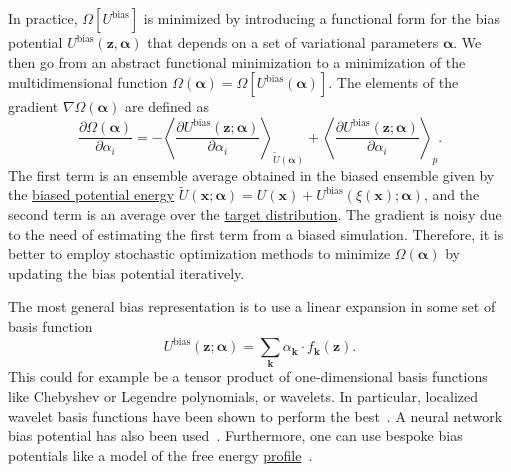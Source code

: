 \documentclass[9pt,review]{livecoms}
\newcommand{\vx}{\mathbf{x}}
\newcommand{\vz}{\mathbf{z}}
\begin{document}
In practice, $\Omega [U^{\mathrm{bias}}]$ is minimized by introducing a functional form for the bias potential $U^\mathrm{bias}(\vz,\boldsymbol{\alpha})$ that depends on a set of variational parameters $\boldsymbol{\alpha}$. We then go from an abstract functional minimization to a minimization of the multidimensional function $\Omega(\boldsymbol{\alpha}) = \Omega [U^{\mathrm{bias}}(\boldsymbol{\alpha})]$. The elements of the gradient $\nabla \Omega(\boldsymbol{\alpha})$ are defined as
\begin{equation}
\frac
{\partial \Omega(\boldsymbol{\alpha})}
{\partial \alpha_{i}}
 = -
\left<
\frac
{\partial U^{\mathrm{bias}}(\vz;\boldsymbol{\alpha})}
{\partial \alpha_{i}}
\right>_{\tilde{U}(\boldsymbol{\alpha})}
+
\left<
\frac
{\partial U^{\mathrm{bias}}(\vz;\boldsymbol{\alpha})}
{\partial \alpha_{i}}
\right>_{p}.
\end{equation}
The first term is an ensemble average obtained in the biased ensemble given by the
\hyperlink{ref:biasingE}{biased potential energy} $\tilde{U}(\vx;\boldsymbol{\alpha}) = U(\vx) + U^{\mathrm{bias}}(\xi(\vx);\boldsymbol{\alpha})$, and the second term is an average over the \hyperlink{ref:targetdist}{target distribution}.  The gradient is noisy due to the need of estimating the first term from a biased simulation. Therefore, it is better to employ stochastic optimization methods to minimize $\Omega(\boldsymbol{\alpha})$ by updating the bias potential iteratively.

The most general bias representation is to use a linear expansion in some set of basis function
\begin{equation}
U^{\mathrm{bias}}(\vz;\boldsymbol{\alpha}) = \sum_{\mathbf{k}} \alpha_{\mathbf{k}} \cdot f_{\mathbf{k}}(\vz).
\end{equation}
This could for example be a tensor product of one-dimensional basis functions like Chebyshev or Legendre polynomials, or wavelets. In particular, localized wavelet basis functions have been shown to perform the best~\cite{ValssonPampel_Wavelets_2022}. A neural network bias potential has also been used~\cite{Bonati2019_NN-VES}. Furthermore, one can use bespoke bias potentials like a model of the free energy \hyperlink{ref:FES} {profile}~\cite{McCarty2016_JCTC,Piaggi2016_Faraday}.
\end{document}
